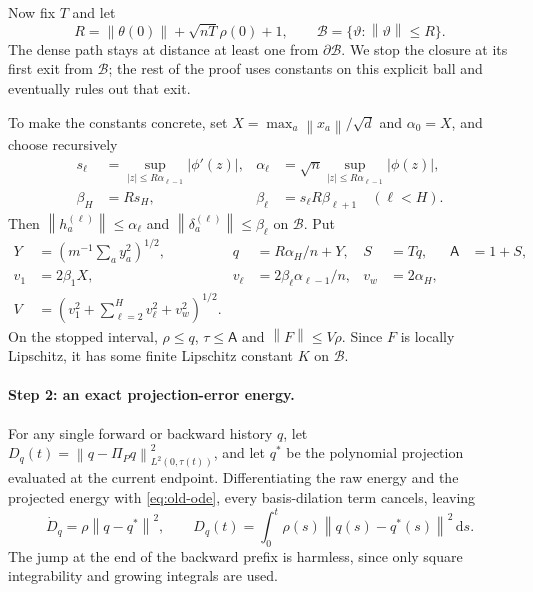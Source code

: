 \documentclass[11pt]{article}
\theoremstyle{definition}
\theoremstyle{remark}
\newcommand{\norm}[1]{\left\lVert #1\right\rVert}
\newcommand{\dd}{\,\mathrm{d}}
\begin{document}
Now fix $T$ and let
\[
 R=\norm{\theta(0)}+\sqrt{nT}\rho(0)+1,
 \qquad \mathcal B=\{\vartheta:\norm{\vartheta}\le R\}.
\]
The dense path stays at distance at least one from $\partial\mathcal B$.  We
stop the closure at its first exit from $\mathcal B$; the rest of the proof uses
constants on this explicit ball and eventually rules out that exit.

To make the constants concrete, set $X=\max_a\norm{x_a}/\sqrt d$ and $\alpha_0=X$, and
choose recursively
\begin{align}
 s_\ell&=\sup_{|z|\le R\alpha_{\ell-1}}|\phi'(z)|,&
 \alpha_\ell&=\sqrt n\sup_{|z|\le R\alpha_{\ell-1}}|\phi(z)|,\nonumber\\
 \beta_H&=R s_H,& \beta_\ell&=s_\ell R\beta_{\ell+1}\quad(\ell<H).
                                                               \label{eq:response-bounds}
\end{align}
Then $\norm{h_a^{(\ell)}}\le\alpha_\ell$ and
$\norm{\delta_a^{(\ell)}}\le\beta_\ell$ on $\mathcal B$.  Put
\begin{align}
 Y&=\left(m^{-1}\sum_a y_a^2\right)^{1/2},&
 q&=R\alpha_H/n+Y,& S&=Tq,& \mathsf A&=1+S,\nonumber\\
 v_1&=2\beta_1X,&
 v_\ell&=2\beta_\ell\alpha_{\ell-1}/n,& v_w&=2\alpha_H,\nonumber\\
 V&=\left(v_1^2+\sum_{\ell=2}^Hv_\ell^2+v_w^2\right)^{1/2}. \label{eq:compact-constants}
\end{align}
On the stopped interval, $\rho\le q$, $\tau\le\mathsf A$ and
$\norm{F}\le V\rho$.  Since $F$ is locally Lipschitz, it has some finite
Lipschitz constant $K$ on $\mathcal B$.

\paragraph{Step 2: an exact projection-error energy.}
For any single forward or backward history $q$, let
$D_q(t)=\norm{q-\Pi_Pq}_{L^2(0,\tau(t))}^2$, and let $q^*$ be the polynomial
projection evaluated at the current endpoint.  Differentiating the raw energy
and the projected energy with \eqref{eq:old-ode}, every basis-dilation term
cancels, leaving
\begin{equation}
 \dot D_q=\rho\norm{q-q^*}^2,
 \qquad D_q(t)=\int_0^t\rho(s)\norm{q(s)-q^*(s)}^2\dd s. \label{eq:projection-energy}
\end{equation}
The jump at the end of the backward prefix is harmless, since only square
integrability and growing integrals are used.
\end{document}
